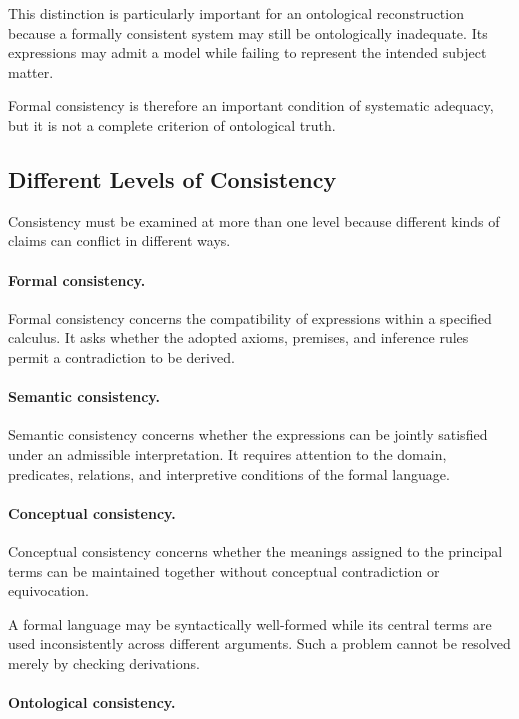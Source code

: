 This distinction is particularly important for an ontological
reconstruction because a formally consistent system may still
be ontologically inadequate. Its expressions may admit a
model while failing to represent the intended subject matter.

Formal consistency is therefore an important condition of
systematic adequacy, but it is not a complete criterion of
ontological truth.

\subsection{Different Levels of Consistency}

Consistency must be examined at more than one level because
different kinds of claims can conflict in different ways.

\paragraph{Formal consistency.}

Formal consistency concerns the compatibility of expressions
within a specified calculus. It asks whether the adopted
axioms, premises, and inference rules permit a contradiction
to be derived.

\paragraph{Semantic consistency.}

Semantic consistency concerns whether the expressions can
be jointly satisfied under an admissible interpretation.
It requires attention to the domain, predicates, relations,
and interpretive conditions of the formal language.

\paragraph{Conceptual consistency.}

Conceptual consistency concerns whether the meanings assigned
to the principal terms can be maintained together without
conceptual contradiction or equivocation.

A formal language may be syntactically well-formed while
its central terms are used inconsistently across different
arguments. Such a problem cannot be resolved merely by
checking derivations.

\paragraph{Ontological consistency.}

